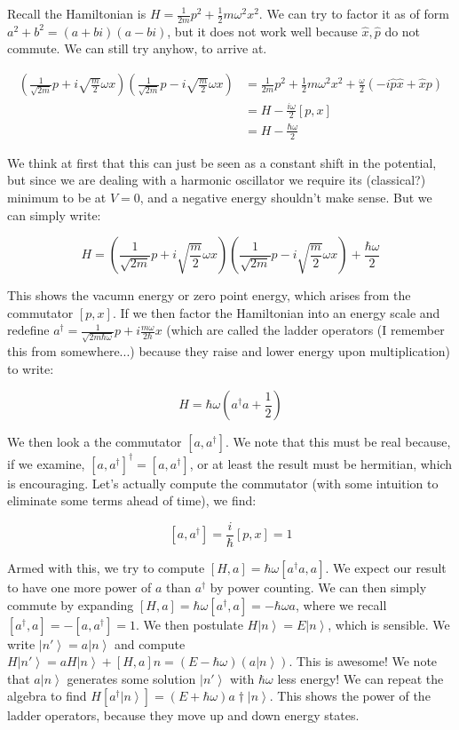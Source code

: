 \documentclass{report}
\newcommand{\ket}[1]{\left| #1 \right>} %
\begin{document}
Recall the Hamiltonian is $H = \frac{1}{2m}p^2 + \frac{1}{2} m\omega^2 x^2$. We can try to factor it as of form $a^2 + b^2 = (a+bi)(a-bi)$, but it does not work well because $\hat{x},\hat{p}$ do not commute. We can still try anyhow, to arrive at.

\begin{align*}
\left(\frac{1}{\sqrt{2m}}p + i\sqrt{\frac{m}{2}}\omega x\right)\left(\frac{1}{\sqrt{2m}}p - i\sqrt{\frac{m}{2}}\omega x\right) &= \frac{1}{2m}p^2 + \frac{1}{2}m\omega^2x^2 + \frac{\omega}{2}(-i\hat{p}\hat{x}+ \hat{x}{p})\\
&= H - \frac{i\omega}{2}[p,x]\\
&= H - \frac{\hbar\omega}{2}
\end{align*}

We think at first that this can just be seen as a constant shift in the potential, but since we are dealing with a harmonic oscillator we require its (classical?) minimum to be at $V=0$, and a negative energy shouldn't make sense. But we can simply write:

$$H = \left(\frac{1}{\sqrt{2m}}p + i\sqrt{\frac{m}{2}}\omega x\right)\left(\frac{1}{\sqrt{2m}}p - i\sqrt{\frac{m}{2}}\omega x\right) + \frac{\hbar\omega}{2}$$

This shows the vacumn energy or zero point energy, which arises from the commutator $[p,x]$. If we then factor the Hamiltonian into an energy scale and redefine $a^\dagger = \frac{1}{\sqrt{2m\hbar\omega}}p + i\frac{m\omega}{2\hbar}x$ (which are called the ladder operators (I remember this from somewhere...) because they raise and lower energy upon multiplication) to write:

$$H = \hbar\omega(a^\dagger a + \frac{1}{2})$$

We then look a the commutator $[a,a^\dagger]$. We note that this must be real because, if we examine, $[a,a^\dagger]^\dagger = [a,a^\dagger]$, or at least the result must be hermitian, which is encouraging. Let's actually compute the commutator (with some intuition to eliminate some terms ahead of time), we find:

$$[a,a^\dagger] = \frac{i}{\hbar}[p,x] = 1$$

Armed with this, we try to compute $[H, a] = \hbar\omega[a^\dagger a, a]$. We expect our result to have one more power of $a$ than $a^\dagger$ by power counting. We can then simply commute by expanding $[H,a] = \hbar\omega[a^\dagger, a] = -\hbar\omega a$, where we recall $[a^\dagger,a] = -[a,a^\dagger] = 1$. We then postulate $H\ket{n} = E\ket{n}$, which is sensible. We write $\ket{n'} = a\ket{n}$ and compute $H\ket{n'} = aH\ket{n} + [H,a]n = (E-\hbar\omega)(a\ket{n})$. This is awesome! We note that $a\ket{n}$ generates some solution $\ket{n'}$ with $\hbar\omega$ less energy! We can repeat the algebra to find $H[a^\dagger \ket{n}] = (E + \hbar\omega)a\dagger\ket{n}$. This shows the power of the ladder operators, because they move up and down energy states.
\end{document}
